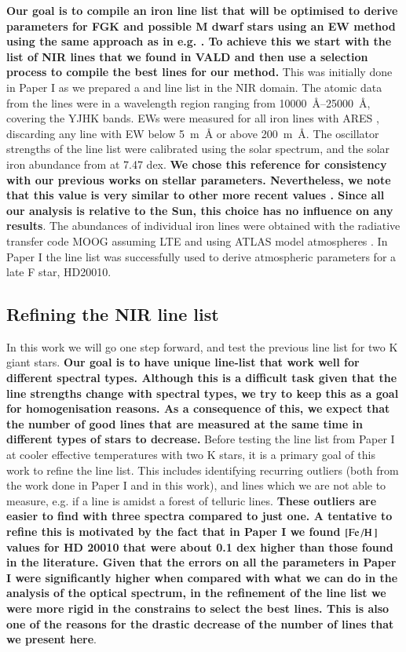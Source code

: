 \documentclass{aa}
\begin{document}
{\bf Our goal is to compile an iron line list that will be optimised to derive parameters for FGK
and possible M dwarf stars using an EW method using the same approach as in e.g. \citet{Sousa2008a}.
To achieve this we start with the list of NIR lines that we found in VALD \citep{VALD1,VALD2} and
then use a selection process to compile the best lines for our method.} This was initially done in
Paper I as we prepared a  and  line list in the NIR domain. The atomic data
from the lines were in a wavelength region ranging from \SIrange{10000}{25000}{\AA}, covering the
YJHK bands. EWs were measured for all iron lines with ARES \citep{Sousa2015a}, discarding any line
with EW below \SI{5}{m\AA} or above \SI{200}{m\AA}. The oscillator strengths of the line list were
calibrated using the solar spectrum, and the solar iron abundance from \citet{Gonzalez2000} at 7.47
dex. {\bf We chose this reference for consistency with our previous works on stellar parameters.
Nevertheless, we note that this value is very similar to other more recent values
\citep[e.g.][]{Asplund2009}. Since all our analysis is relative to the Sun, this choice has no
influence on any results}. The abundances of individual iron lines were obtained with the radiative
transfer code MOOG \citep{Sneden1973} assuming LTE and using ATLAS model atmospheres
\citep{Kurucz1993}. In Paper I the line list was successfully used to derive atmospheric parameters
for a late F star, HD20010.


\subsection{Refining the NIR line list}
\label{sec:refining_the_line_list}

In this work we will go one step forward, and test the previous line list for two K giant stars.
{\bf Our goal is to have unique line-list that work well for different spectral types. Although this
is a difficult task given that the line strengths change with spectral types, we try to keep this as
a goal for homogenisation reasons. As a consequence of this, we expect that the number of good lines
that are measured at the same time in different types of stars to decrease.} Before testing the line
list from Paper I at cooler effective temperatures with two K stars, it is a primary goal of this
work to refine the line list. This includes identifying recurring outliers (both from the work done
in Paper I and in this work), and lines which we are not able to measure, e.g. if a line is amidst a
forest of telluric lines. {\bf These outliers are easier to find with three spectra compared to just
one. A tentative to refine this is motivated by the fact that in Paper I we found
$[\ion{Fe}/\ion{H}]$ values for HD 20010 that were about 0.1 dex higher than those found in the
literature. Given that the errors on all the parameters in Paper I were significantly higher when
compared with what we can do in the analysis of the optical spectrum, in the refinement of the line
list we were more rigid in the constrains to select the best lines. This is also one of the reasons
for the drastic decrease of the number of lines that we present here}.
\end{document}
